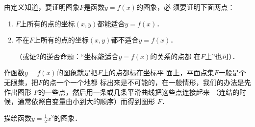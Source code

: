 由定义知道，要证明图象$F$是函数$y=f(x)$的图象，必
须要证明下面两点：
\begin{enumerate}
    \item  $F$上所有的点的坐标$(x,y)$都能适合$y=f(x)$．
\item 不在$F$上所有的点的坐标$(x,y)$都不适合$y=f(x)$．

（或证2的逆否命题：“坐标能适合$y=f(x)$的关系的点都
在$F$上”也可）．
\end{enumerate}

作函数$y=f(x)$的图象就是把$F$上的点都标在坐标平
面上，平面点集$F$一般是个无限集，把$F$的点一个一个地都
标出来是不可能的，在一般情形，我们的办法是先作出图形
$F$的一些点，然后用一条或几条平滑曲线把这些点连接起来
（连结的时候，通常依照自变量由小到大的顺序）而得到图形
$F$．

\begin{example}
描绘函数$y=\frac{1}{2}x^2$的图象．
\end{example}

